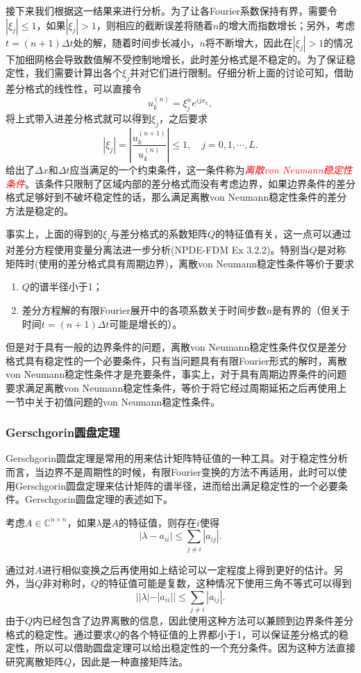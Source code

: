 \documentclass[a4paper,10pt]{ctexart}
\begin{document}
接下来我们根据这一结果来进行分析。为了让各Fourier系数保持有界，需要令$ |\xi_j| \leqslant 1 $，如果$ |\xi_j|>1 $，则相应的截断误差将随着$ n $的增大而指数增长；另外，考虑$ t=(n+1)\Delta t $处的解，随着时间步长减小，$ n $将不断增大，因此在$ |\xi_j|>1 $的情况下加细网格会导致数值解不受控制地增长，此时差分格式是不稳定的。为了保证稳定性，我们需要计算出各个$ \xi_j $并对它们进行限制。仔细分析上面的讨论可知，借助差分格式的线性性，可以直接令
\begin{equation}
    u^{(n)}_k = \xi_j^n e^{ijx_k},
\end{equation}
将上式带入进差分格式就可以得到$ \xi_j $，之后要求
\begin{equation}
    |\xi_j| = \left\vert \frac{u^{(n+1)}_k}{u^{(n)}_k} \right\vert \leqslant 1,\quad  j=0,1,\cdots ,L.
\end{equation}
给出了$ \Delta x $和$ \Delta t $应当满足的一个约束条件，这一条件称为\textcolor{red}{\emph{离散von Neumann稳定性条件}}。该条件只限制了区域内部的差分格式而没有考虑边界，如果边界条件的差分格式足够好到不破坏稳定性的话，那么满足离散von Neumann稳定性条件的差分方法是稳定的。

事实上，上面的得到的$ \xi_j $与差分格式的系数矩阵$ Q $的特征值有关，这一点可以通过对差分方程使用变量分离法进一步分析(NPDE-FDM Ex 3.2.2)。特别当$ Q $是对称矩阵时(使用的差分格式具有周期边界)，离散von Neumann稳定性条件等价于要求
\begin{enumerate}
    \item $ Q $的谱半径小于1；
    \item 差分方程解的有限Fourier展开中的各项系数关于时间步数$ n $是有界的（但关于时间$ t = (n+1)\Delta t $可能是增长的）。
\end{enumerate}

但是对于具有一般的边界条件的问题，离散von Neumann稳定性条件仅仅是差分格式具有稳定性的一个必要条件，只有当问题具有有限Fourier形式的解时，离散von Neumann稳定性条件才是充要条件，事实上，对于具有周期边界条件的问题要求满足离散von Neumann稳定性条件，等价于将它经过周期延拓之后再使用上一节中关于初值问题的von Neumann稳定性条件。

\subsubsection{Gerschgorin圆盘定理}
Gerschgorin圆盘定理是常用的用来估计矩阵特征值的一种工具。对于稳定性分析而言，当边界不是周期性的时候，有限Fourier变换的方法不再适用，此时可以使用Gerschgorin圆盘定理来估计矩阵的谱半径，进而给出满足稳定性的一个必要条件。Gerschgorin圆盘定理的表述如下。
\begin{theorem}
    考虑$ A\in \mathbb{C}^{n\times n} $，如果$ \lambda $是$ A $的特征值，则存在$ i $使得
    \[
        |\lambda - a_{ii}| \leqslant \sum_{j\ne i} |a_{ij}|.
    \]
\end{theorem}
\noindent 通过对$ A $进行相似变换之后再使用如上结论可以一定程度上得到更好的估计。另外，当$ Q $非对称时，$ Q $的特征值可能是复数，这种情况下使用三角不等式可以得到
\[
    | |\lambda| - |a_{ii}| |\leqslant \sum_{j\ne i} |a_{ij}|.
\]
由于$ Q $内已经包含了边界离散的信息，因此使用这种方法可以兼顾到边界条件差分格式的稳定性。通过要求$ Q $的各个特征值的上界都小于1，可以保证差分格式的稳定性，所以可以借助圆盘定理可以给出稳定性的一个充分条件。因为这种方法直接研究离散矩阵$ Q $，因此是一种直接矩阵法。
\end{document}
